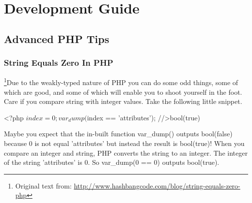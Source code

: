 \chapter{Development Guide}

\section{Advanced PHP Tips}
\subsection{String Equals Zero In PHP}
\footnote{Original text from: \url{http://www.hashbangcode.com/blog/string-equals-zero-php}}Due to the weakly-typed nature of PHP you can do some odd things, some of which are good, and some of which will enable you to shoot yourself in the foot. Care if you compare string with integer values. Take the following little snippet.

\begin{pyglist}[language=php,numbers=left,numbersep=5pt]
<?php
$index = 0;
var_dump($index == 'attributes'); //>bool(true)
\end{pyglist}

Maybe you expect that the in-built function var\_dump() outputs bool(false) because 0 is not equal 'attributes' but instead the result is bool(true)! When you compare an integer and string, PHP converts the string to an integer. The integer of the string 'attributes' is 0. So var\_dump(0 == 0) outputs bool(true).